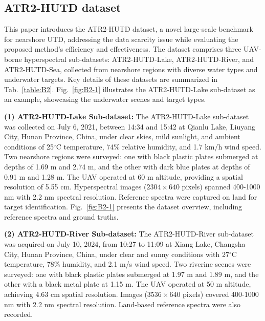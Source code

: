 \subsection{ATR2-HUTD dataset}\label{sec:2.2}
This paper introduces the ATR2-HUTD dataset, a novel large-scale benchmark for nearshore UTD, addressing the data scarcity issue while evaluating the proposed method's efficiency and effectiveness.  
The dataset comprises three UAV-borne hyperspectral sub-datasets: ATR2-HUTD-Lake, ATR2-HUTD-River, and ATR2-HUTD-Sea, collected from nearshore regions with diverse water types and underwater targets.  
Key details of these datasets are summarized in Tab.~\ref{table:B2}.
Fig.~\ref{fig:B2-1} illustrates the ATR2-HUTD-Lake sub-dataset as an example, showcasing the underwater scenes and target types.
\par
\textbf{(1) ATR2-HUTD-Lake Sub-dataset:}  
The ATR2-HUTD-Lake sub-dataset was collected on July 6, 2021, between 14:34 and 15:42 at Qianlu Lake, Liuyang City, Hunan Province, China, under clear skies, mild sunlight, and ambient conditions of 25$^\circ$C temperature, 74\% relative humidity, and 1.7 km/h wind speed. Two nearshore regions were surveyed: one with black plastic plates submerged at depths of 1.69 m and 2.74 m, and the other with dark blue plates at depths of 0.91 m and 1.28 m. The UAV operated at 60 m altitude, providing a spatial resolution of 5.55 cm. Hyperspectral images ($2304 \times 640$ pixels) spanned 400-1000 nm with 2.2 nm spectral resolution. Reference spectra were captured on land for target identification. Fig.~\ref{fig:B2-1} presents the dataset overview, including reference spectra and ground truths.
\par
\textbf{(2) ATR2-HUTD-River Sub-dataset:}  
The ATR2-HUTD-River sub-dataset was acquired on July 10, 2024, from 10:27 to 11:09 at Xiang Lake, Changsha City, Hunan Province, China, under clear and sunny conditions with 27$^\circ$C temperature, 78\% humidity, and 2.1 m/s wind speed. Two riverine scenes were surveyed: one with black plastic plates submerged at 1.97 m and 1.89 m, and the other with a black metal plate at 1.15 m. The UAV operated at 50 m altitude, achieving 4.63 cm spatial resolution. Images ($3536 \times 640$ pixels) covered 400-1000 nm with 2.2 nm spectral resolution. Land-based reference spectra were also recorded. 
\par
